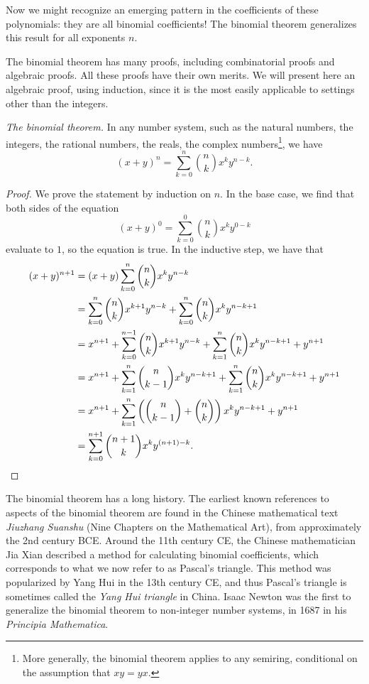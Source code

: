 Now we might recognize an emerging pattern in the coefficients of these polynomials: they are all binomial coefficients! The binomial theorem generalizes this result for all exponents $n$.

The binomial theorem has many proofs, including combinatorial proofs and algebraic proofs. All these proofs have their own merits. We will present here an algebraic proof, using induction, since it is the most easily applicable to settings other than the integers.

\begin{theorem}\label{theorem:binomial-theorem}
  \emph{The binomial theorem.} In any number system, such as the natural numbers, the integers, the rational numbers, the reals, the complex numbers\footnote{More generally, the binomial theorem applies to any semiring, conditional on the assumption that $xy=yx$.}, we have
  \begin{equation*}
    (x+y)^n = \sum_{k=0}^n \binom{n}{k}x^ky^{n-k}.
  \end{equation*}
\end{theorem}

\begin{proof}
  We prove the statement by induction on $n$. In the base case, we find that both sides of the equation
  \begin{equation*}
    (x+y)^0=\sum_{k=0}^0 \binom{n}{k}x^ky^{0-k}
  \end{equation*}
  evaluate to $1$, so the equation is true. In the inductive step, we have that
  \begin{align*}
    (x+y)^{n+1} & =(x+y)\sum_{k=0}^n \binom{n}{k}x^ky^{n-k} \\
                & = \sum_{k=0}^n \binom{n}{k}x^{k+1}y^{n-k} + \sum_{k=0}^n\binom{n}{k}x^ky^{n-k+1} \\
                & = x^{n+1} + \sum_{k=0}^{n-1} \binom{n}{k}x^{k+1}y^{n-k} + \sum_{k=1}^n\binom{n}{k}x^ky^{n-k+1} + y^{n+1} \\
                & = x^{n+1} + \sum_{k=1}^{n} \binom{n}{k-1}x^{k}y^{n-k+1} + \sum_{k=1}^n\binom{n}{k}x^ky^{n-k+1} + y^{n+1} \\
                & = x^{n+1} + \sum_{k=1}^n \left(\binom{n}{k-1}+\binom{n}{k}\right)x^ky^{n-k+1}+y^{n+1} \\
    & = \sum_{k=0}^{n+1} \binom{n+1}{k}x^ky^{(n+1)-k}.\qedhere
  \end{align*}
\end{proof}

The binomial theorem has a long history. The earliest known references to aspects of the binomial theorem are found in the Chinese mathematical text \emph{Jiuzhang Suanshu} (Nine Chapters on the Mathematical Art), from approximately the 2nd century BCE. Around the 11th century CE, the Chinese mathematician Jia Xian described a method for calculating binomial coefficients, which corresponds to what we now refer to as Pascal’s triangle. This method was popularized by Yang Hui in the 13th century CE, and thus Pascal’s triangle is sometimes called the \emph{Yang Hui triangle} in China. Isaac Newton was the first to generalize the binomial theorem to non-integer number systems, in 1687 in his \emph{Principia Mathematica}.

